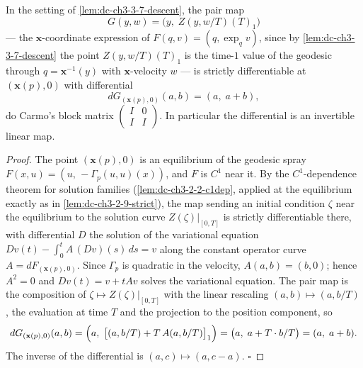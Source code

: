 \begin{lemma}
  \label{lem:dc-ch3-3-7-pairmap}
  \leanok
  In the setting of \cref{lem:dc-ch3-3-7-descent}, the pair map
  $$
  G(y,w)=\bigl(y,\;Z(y,w/T)(T)_1\bigr)
  $$
  — the $\mathbf{x}$-coordinate expression of $F(q,v)=(q,\exp_q v)$, since by
  \cref{lem:dc-ch3-3-7-descent} the point $Z(y,w/T)(T)_1$ is the time-$1$ value
  of the geodesic through $q=\mathbf{x}^{-1}(y)$ with $\mathbf{x}$-velocity $w$ —
  is strictly differentiable at $(\mathbf{x}(p),0)$ with differential
  $$
  dG_{(\mathbf{x}(p),0)}(a,b)=(a,\;a+b),
  $$
  do Carmo's block matrix $\begin{pmatrix}I & 0\\ I & I\end{pmatrix}$. In
  particular the differential is an invertible linear map.
\end{lemma}
\begin{proof}
  \leanok
  The point $(\mathbf{x}(p),0)$ is an equilibrium of the geodesic spray
  $F(x,u)=(u,\,-\Gamma_p(u,u)(x))$, and $F$ is $C^1$ near it. By the
  $C^1$-dependence theorem for solution families
  (\cref{lem:dc-ch3-2-2-c1dep}, applied at the equilibrium exactly as in
  \cref{lem:dc-ch3-2-9-strict}), the map sending an initial condition $\zeta$
  near the equilibrium to the solution curve $Z(\zeta)|_{[0,T]}$ is strictly
  differentiable there, with differential $D$ the solution of the variational
  equation $Dv(t)-\int_0^t A\,(Dv)(s)\,ds=v$ along the constant operator curve
  $A=dF_{(\mathbf{x}(p),0)}$. Since $\Gamma_p$ is quadratic in the velocity,
  $A(a,b)=(b,0)$; hence $A^2=0$ and $Dv(t)=v+tAv$ solves the variational
  equation. The pair map is the composition of $\zeta\mapsto Z(\zeta)|_{[0,T]}$
  with the linear rescaling $(a,b)\mapsto(a,b/T)$, the evaluation at time $T$
  and the projection to the position component, so
  $$
  dG_{(\mathbf{x}(p),0)}(a,b)
    =\Bigl(a,\;\bigl[(a,b/T)+T\,A(a,b/T)\bigr]_1\Bigr)
    =\bigl(a,\;a+T\cdot b/T\bigr)=(a,\;a+b).
  $$
  The inverse of the differential is $(a,c)\mapsto(a,c-a)$. $\square$
\end{proof}

